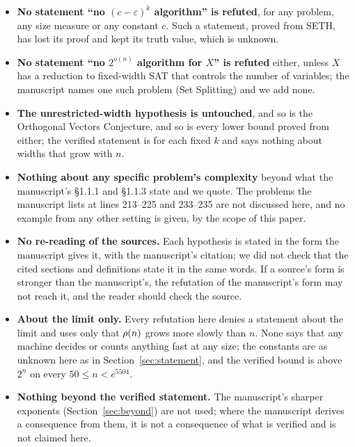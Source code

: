 \begin{itemize}
\item \textbf{No statement ``no $(c-\varepsilon)^k$ algorithm'' is
  refuted}, for any problem, any size measure or any constant $c$. Such
  a statement, proved from SETH, has lost its proof and kept its truth
  value, which is unknown.
\item \textbf{No statement ``no $2^{o(n)}$ algorithm for $X$'' is
  refuted} either, unless $X$ has a reduction to fixed-width SAT that
  controls the number of variables; the manuscript names one such
  problem (Set Splitting) and we add none.
\item \textbf{The unrestricted-width hypothesis is untouched}, and so is
  the Orthogonal Vectors Conjecture, and so is every lower bound proved
  from either; the verified statement is for each fixed $k$ and says
  nothing about widths that grow with $n$.
\item \textbf{Nothing about any specific problem's complexity} beyond
  what the manuscript's \S1.1.1 and \S1.1.3 state and we quote. The
  problems the manuscript lists at lines 213--225 and 233--235 are not
  discussed here, and no example from any other setting is given, by
  the scope of this paper.
\item \textbf{No re-reading of the sources.} Each hypothesis is stated
  in the form the manuscript gives it, with the manuscript's citation;
  we did not check that the cited sections and definitions state it in
  the same words. If a source's form is stronger than the manuscript's,
  the refutation of the manuscript's form may not reach it, and the
  reader should check the source.
\item \textbf{About the limit only.} Every refutation here denies a
  statement about the limit and uses only that $\rho(n)$ grows more
  slowly than $n$. None says that any machine decides or counts
  anything fast at any size; the constants are as unknown here as in
  Section~\ref{sec:statement}, and the verified bound is above $2^n$ on
  every $50 \le n < e^{5504}$.
\item \textbf{Nothing beyond the verified statement.} The manuscript's
  sharper exponents (Section~\ref{sec:beyond}) are not used; where the
  manuscript derives a consequence from them, it is not a consequence
  of what is verified and is not claimed here.
\end{itemize}
